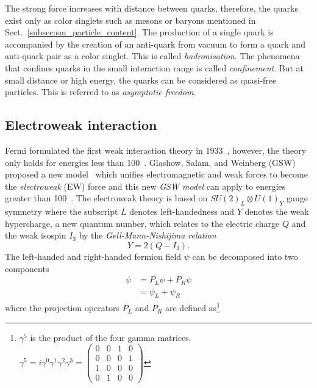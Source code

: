 The strong force increases with distance between quarks, therefore, the quarks exist only as color singlets such as mesons or baryons mentioned in Sect.~\ref{subsec:sm_particle_content}.
The production of a single quark is accompanied by the creation of an anti-quark from vacuum to form a quark and anti-quark pair as a color singlet.
This is called \textit{hadronisation}.
The phenomena that confines quarks in the small interaction range is called \textit{confinement}.
But at small distance or high energy, the quarks can be considered as quasi-free particles.
This is referred to as \textit{asymptotic freedom}.


\subsection{Electroweak interaction}
\label{subsec:sm_ewk_interaction}
Fermi formulated the first weak interaction theory in 1933~\cite{Fermi:1934hr}, however, the theory only holds for energies less than 100~{\GeV}.
Glashow, Salam, and Weinberg (GSW) proposed a new model~\cite{Salam:1968rm, Weinberg:1967tq, Glashow:1961tr} which unifies electromagnetic and weak forces to become the \textit{electroweak} (EW) force and this new \textit{GSW model} can apply to energies greater than 100~{\GeV}.
The electroweak theory is based on $SU(2)_{L} \otimes U(1)_{Y}$ gauge symmetry where the subscript $L$ denotes left-handedness and $Y$ denotes the weak hypercharge, a new quantum number, which relates to the electric charge $Q$ and the weak isospin $I_{3}$ by the \textit{Gell-Mann-Nishijima relation}~\cite{Nakano:1953zz, Gell-Mann:1956iqa}
%
\begin{equation}
    Y = 2(Q - I_{3}).
    \label{eq:sm_hypercharge}
\end{equation}
%
The left-handed and right-handed fermion field $\psi$ can be decomposed into two components
%
\begin{align}
    \psi & = P_{L}\psi + P_{R}\psi\\
         & = \psi_{L} + \psi_{R}
    \label{eq:sm_fermion_field_components}
\end{align}
%
where the projection operators $P_{L}$ and $P_{R}$ are defined as\footnote{$\gamma^{5}$ is the product of the four gamma matrices. $\gamma^{5} = i \gamma^{0} \gamma^{1} \gamma^{2} \gamma^{3} = \left(\begin{matrix}0 & 0 & 1 & 0\\0 & 0 & 0 & 1\\1 & 0 & 0 & 0\\0 & 1 & 0 & 0\end{matrix}\right)$}
